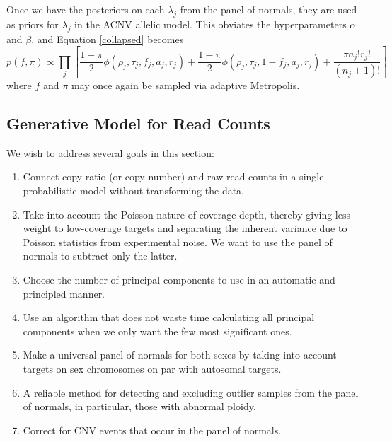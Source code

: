 \documentclass[nofootinbib,amssymb,amsmath]{revtex4}
\begin{document}
Once we have the posteriors on each $\lambda_j$ from the panel of normals, they are used as priors for $\lambda_j$ in the ACNV allelic model.  This obviates the hyperparameters $\alpha$ and $\beta$, and Equation \ref{collapsed} becomes
%
\begin{equation}
p(f, \pi) \propto \prod_j 
\left[    \frac{1-\pi}{2} \phi(\rho_j, \tau_j, f_j, a_j, r_j)  +
\frac{1-\pi}{2} \phi(\rho_j, \tau_j, 1 - f_j, a_j, r_j)  +
 \frac{ \pi a_j! r_j!}{(n_j + 1)!}    \right]
 \label{collapsed_using_pon}
\end{equation}
%
where $f$ and $\pi$ may once again be sampled via adaptive Metropolis.

\subsection{Generative Model for Read Counts} \label{coverage-model}

\noindent We wish to address several goals in this section:

\begin{enumerate}

\item Connect copy ratio (or copy number) and raw read counts in a single probabilistic model without transforming the data.

\item Take into account the Poisson nature of coverage depth, thereby giving less weight to low-coverage targets and separating the inherent variance due to Poisson statistics from experimental noise.  We want to use the panel of normals to subtract only the latter.

\item Choose the number of principal components to use in an automatic and principled manner.

\item Use an algorithm that does not waste time calculating all principal components when we only want the few most significant ones.

\item Make a universal panel of normals for both sexes by taking into account targets on sex chromosomes on par with autosomal targets.

\item A reliable method for detecting and excluding outlier samples from the panel of normals, in particular, those with abnormal ploidy.

\item Correct for CNV events that occur in the panel of normals.

\end{enumerate}
\end{document}
